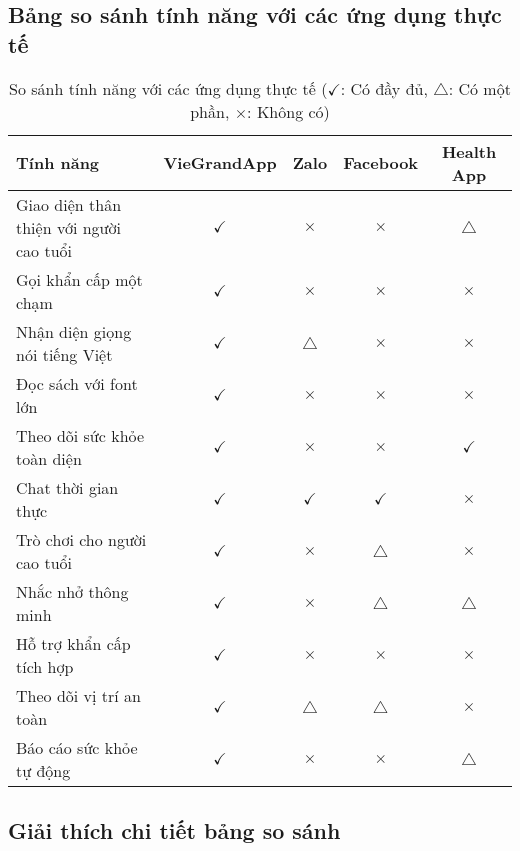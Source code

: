 \documentclass[12pt,a4paper]{article}
\begin{document}
\subsection{Bảng so sánh tính năng với các ứng dụng thực tế}
\begin{table}[H]
\centering
\begin{tabular}{|p{3.5cm}|c|c|c|c|}
\hline
\textbf{Tính năng} & \textbf{VieGrandApp} & \textbf{Zalo} & \textbf{Facebook} & \textbf{Health App} \\
\hline
Giao diện thân thiện với người cao tuổi & $\checkmark$ & $\times$ & $\times$ & $\triangle$ \\
\hline
Gọi khẩn cấp một chạm & $\checkmark$ & $\times$ & $\times$ & $\times$ \\
\hline
Nhận diện giọng nói tiếng Việt & $\checkmark$ & $\triangle$ & $\times$ & $\times$ \\
\hline
Đọc sách với font lớn & $\checkmark$ & $\times$ & $\times$ & $\times$ \\
\hline
Theo dõi sức khỏe toàn diện & $\checkmark$ & $\times$ & $\times$ & $\checkmark$ \\
\hline
Chat thời gian thực & $\checkmark$ & $\checkmark$ & $\checkmark$ & $\times$ \\
\hline
Trò chơi cho người cao tuổi & $\checkmark$ & $\times$ & $\triangle$ & $\times$ \\
\hline
Nhắc nhở thông minh & $\checkmark$ & $\times$ & $\triangle$ & $\triangle$ \\
\hline

\hline
Hỗ trợ khẩn cấp tích hợp & $\checkmark$ & $\times$ & $\times$ & $\times$ \\
\hline
Theo dõi vị trí an toàn & $\checkmark$ & $\triangle$ & $\triangle$ & $\times$ \\
\hline
Báo cáo sức khỏe tự động & $\checkmark$ & $\times$ & $\times$ & $\triangle$ \\
\hline
\end{tabular}
\caption{So sánh tính năng với các ứng dụng thực tế ($\checkmark$: Có đầy đủ, $\triangle$: Có một phần, $\times$: Không có)}
\end{table}

\subsection{Giải thích chi tiết bảng so sánh}
\end{document}

